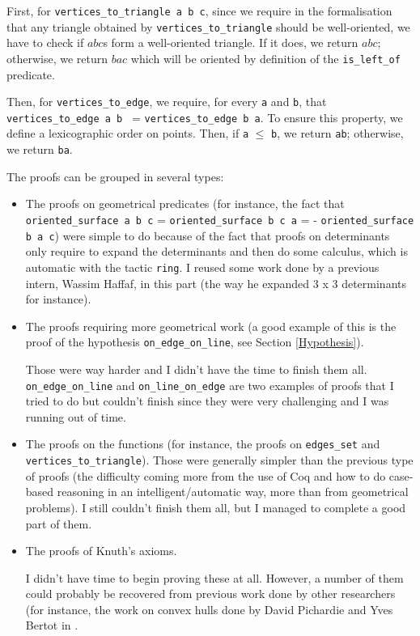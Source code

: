 \documentclass[a4paper,10pt]{article}
\begin{document}
\begin{itemize}
  First, for {\tt vertices\_to\_triangle a b c}, since we require in the formalisation that any triangle obtained by {\tt vertices\_to\_triangle} should be well-oriented, we have to check if $abc$s form a well-oriented triangle. If it does, we return $abc$; otherwise, we return $bac$ which will be oriented by definition of the {\tt is\_left\_of} predicate.

  Then, for {\tt vertices\_to\_edge}, we require, for every {\tt a} and {\tt b}, that {\tt vertices\_to\_edge a b } = {\tt vertices\_to\_edge b a}. To ensure this property, we define a lexicographic order on points. Then, if {\tt a} $\leq$ {\tt b}, we return {\tt ab}; otherwise, we return {\tt ba}.
\end{itemize}
The proofs can be grouped in several types:
\begin{itemize}
\item The proofs on geometrical predicates (for instance, the fact that {\tt oriented\_surface a b c} = {\tt oriented\_surface b c a} = {- \tt oriented\_surface b a c}) were simple to do because of the fact that proofs on determinants only require to expand the determinants and then do some calculus, which is automatic with the tactic {\tt ring}. I reused some work done by a previous intern, Wassim Haffaf, in this part (the way he expanded 3 x 3 determinants for instance).
\item The proofs requiring more geometrical work (a good example of this is the proof of the hypothesis {\tt on\_edge\_on\_line}, see Section \ref{Hypothesis}).

  Those were way harder and I didn't have the time to finish them all. {\tt on\_edge\_on\_line} and {\tt on\_line\_on\_edge} are two examples of proofs that I tried to do but couldn't finish since they were very challenging and I was running out of time.
  \item The proofs on the functions (for instance, the proofs on {\tt edges\_set} and {\tt vertices\_to\_triangle}). Those were generally simpler than the previous type of proofs (the difficulty coming more from the use of {\sc Coq} and how to do case-based reasoning in an intelligent/automatic way, more than from geometrical problems). I still couldn't finish them all, but I managed to complete a good part of them. 

  \item The proofs of Knuth's axioms.

    I didn't have time to begin proving these at all. However, a number of them could probably be recovered from previous work done by other researchers (for instance, the work on convex hulls done by David Pichardie and Yves Bertot in \cite{Hull}.
  \end{itemize}
\end{document}
